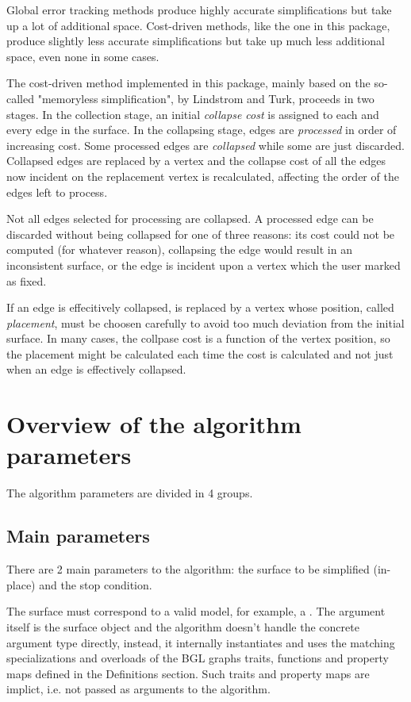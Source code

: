 Global error tracking methods produce highly accurate simplifications but take up a lot of additional space. Cost-driven methods, like the one in this package, produce slightly less accurate simplifications but take up much less additional space, even none in some cases.

The cost-driven method implemented in this package, mainly based on the so-called "memoryless simplification", by Lindstrom and Turk, proceeds in two stages. In the collection stage, an initial {\em collapse cost} is assigned to each and every edge in the surface. In the collapsing stage, edges are {\em processed} in order of increasing cost. Some processed edges are {\em collapsed} while some are just discarded. Collapsed edges are replaced by a vertex and the collapse cost of all the edges now incident on the replacement vertex is recalculated, affecting the order of the edges left to process.

Not all edges selected for processing are collapsed. A processed edge can be discarded without being collapsed for one of three reasons: its cost could not be computed (for whatever reason), collapsing the edge would result in an inconsistent surface, or the edge is incident upon a vertex which the user marked as fixed.

If an edge is effecitively collapsed, is replaced by a vertex whose position, called {\em placement}, must be choosen carefully to avoid too much deviation from the initial surface. In many cases, the collpase cost is a function of the vertex position, so the placement might be calculated each time the cost is calculated and not just when an edge is effectively collapsed.

\section{Overview of the algorithm parameters}

The algorithm parameters are divided in 4 groups.

\subsection{Main parameters}

There are 2 main parameters to the algorithm: the surface to be simplified (in-place) and the stop condition.

The surface must correspond to a valid  model, for example, a . The argument itself is the surface object and the algorithm doesn't handle the concrete argument type directly, instead, it internally instantiates and uses the matching specializations and overloads of the BGL graphs traits, functions and property maps defined in the Definitions section. Such traits and property maps are implict, i.e. not passed as arguments to the algorithm.


